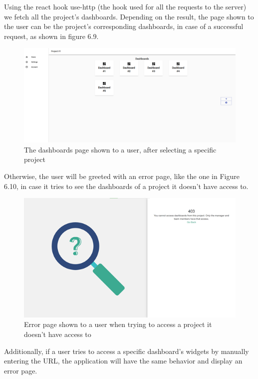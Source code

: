 \documentclass[a4paper,twoside,10pt]{report}
\begin{document}
Using the react hook use-http (the hook used for all the requests to the server) we fetch all the project’s dashboards.
Depending on the result, the page shown to the user can be the project’s corresponding dashboards, in case of a successful request,  as shown in figure 6.9.
\begin{figure}[h!]
\center
  \includegraphics[width=\textwidth]{dashboardsPage.png}
\caption{The dashboards page shown to a user, after selecting a specific project}
\end{figure}

\newpage
Otherwise, the user will be greeted with an error page, like the one in Figure 6.10, in case it tries to see the dashboards of a project it doesn't have access to.

\begin{figure}[h!]
\center
  \includegraphics[width=\textwidth]{error-403.png}
\caption{Error page shown to a user when trying to access a project it doesn't have access to}
\end{figure}

Additionally, if a user tries to access a specific dashboard’s widgets by manually entering the URL, the application will have the same behavior and display an error page.
\end{document}
